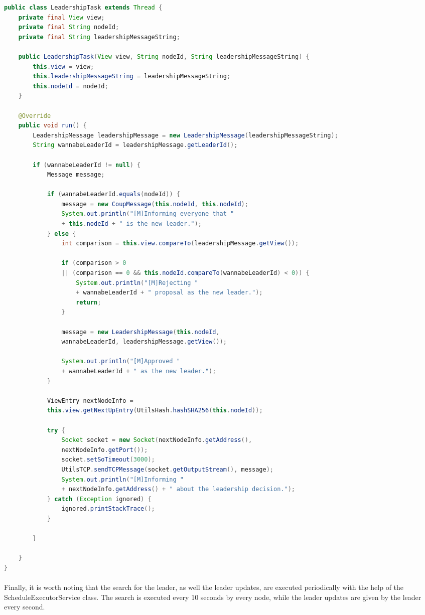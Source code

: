 \documentclass{report}
\begin{document}
        	\begin{adjustbox}{center}
        		\begin{lstlisting}[language=java]
public class LeadershipTask extends Thread {
	private final View view;
	private final String nodeId;
	private final String leadershipMessageString;
	
	public LeadershipTask(View view, String nodeId, String leadershipMessageString) {
		this.view = view;
		this.leadershipMessageString = leadershipMessageString;
		this.nodeId = nodeId;
	}
	
	@Override
	public void run() {
		LeadershipMessage leadershipMessage = new LeadershipMessage(leadershipMessageString);
		String wannabeLeaderId = leadershipMessage.getLeaderId();
		
		if (wannabeLeaderId != null) {
			Message message;
			
			if (wannabeLeaderId.equals(nodeId)) {
				message = new CoupMessage(this.nodeId, this.nodeId);
				System.out.println("[M]Informing everyone that " 
				+ this.nodeId + " is the new leader.");
			} else {
				int comparison = this.view.compareTo(leadershipMessage.getView());
				
				if (comparison > 0 
				|| (comparison == 0 && this.nodeId.compareTo(wannabeLeaderId) < 0)) {
					System.out.println("[M]Rejecting " 
					+ wannabeLeaderId + " proposal as the new leader.");
					return;
				}
				
				message = new LeadershipMessage(this.nodeId, 
				wannabeLeaderId, leadershipMessage.getView());
				
				System.out.println("[M]Approved " 
				+ wannabeLeaderId + " as the new leader.");
			}
			
			ViewEntry nextNodeInfo = 
			this.view.getNextUpEntry(UtilsHash.hashSHA256(this.nodeId));
			
			try {
				Socket socket = new Socket(nextNodeInfo.getAddress(),
				nextNodeInfo.getPort());
				socket.setSoTimeout(3000);
				UtilsTCP.sendTCPMessage(socket.getOutputStream(), message);
				System.out.println("[M]Informing " 
				+ nextNodeInfo.getAddress() + " about the leadership decision.");
			} catch (Exception ignored) {
				ignored.printStackTrace();
			}
			
		}
		
	}
}
        		\end{lstlisting}
        	\end{adjustbox}
        	
        	\paragraph{}Finally, it is worth noting that the search for the leader, as well the leader updates, are executed periodically with the help of the ScheduleExecutorService class. The search is executed every 10 seconds by every node, while the leader updates are given by the leader every second.
\end{document}
